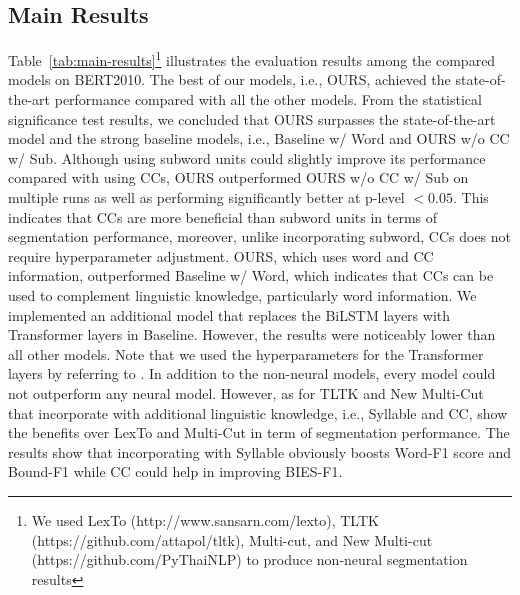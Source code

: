 \subsection{Main Results}\label{section:main-results}

Table~\ref{tab:main-results}\footnote{We used LexTo (http://www.sansarn.com/lexto), TLTK (https://github.com/attapol/tltk), Multi-cut, and New Multi-cut (https://github.com/PyThaiNLP) to produce non-neural segmentation results} illustrates the evaluation results among the compared models on BERT2010.
%
The best of our models, i.e., OURS, achieved the state-of-the-art performance compared with all the other models.
%
From the statistical significance test results, we concluded that OURS surpasses the state-of-the-art model and the strong baseline models, i.e., Baseline w/ Word and OURS w/o CC w/ Sub.
%
Although using subword units could slightly improve its performance compared with using CCs, OURS outperformed OURS w/o CC w/ Sub on multiple runs as well as performing significantly better at p-level $< 0.05$. 
%
This indicates that CCs are more beneficial than subword units in terms of segmentation performance, moreover, unlike incorporating subword, CCs does not require hyperparameter adjustment.
%
OURS, which uses word and CC information, outperformed Baseline w/ Word, which indicates that CCs can be used to complement linguistic knowledge, particularly word information.
%
We implemented an additional model that replaces the BiLSTM layers with Transformer layers \cite{Vaswani2017} in Baseline. However, the results were noticeably lower than all other models. Note that we used the hyperparameters for the Transformer layers by referring to .
%
In addition to the non-neural models, every model could not outperform any neural model.
%
However, as for TLTK and New Multi-Cut that incorporate with additional linguistic knowledge, i.e., Syllable and CC, show the benefits over LexTo and Multi-Cut in term of segmentation performance.
%
The results show that incorporating with Syllable obviously boosts Word-F1 score and Bound-F1 while CC could help in improving BIES-F1.

